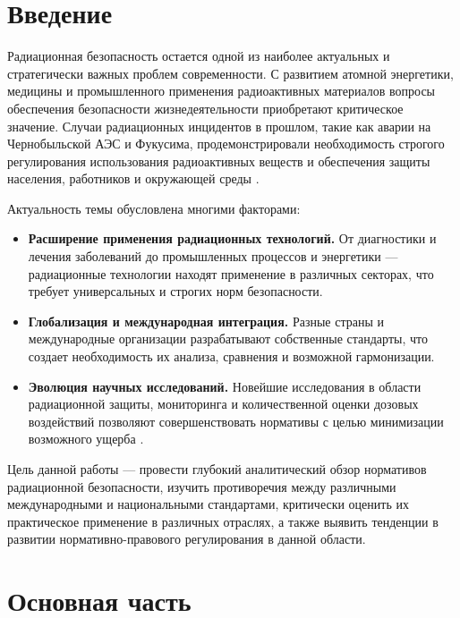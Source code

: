 \documentclass[a4paper, 14pt]{extarticle}
\begin{document}

\tableofcontents
\newpage

\section{Введение}

Радиационная безопасность остается одной из наиболее актуальных и стратегически важных проблем современности. С развитием атомной энергетики, медицины и промышленного применения радиоактивных материалов вопросы обеспечения безопасности жизнедеятельности приобретают критическое значение. Случаи радиационных инцидентов в прошлом, такие как аварии на Чернобыльской АЭС и Фукусима, продемонстрировали необходимость строгого регулирования использования радиоактивных веществ и обеспечения защиты населения, работников и окружающей среды \cite{4}.

Актуальность темы обусловлена многими факторами:

\begin{itemize}
    \item \textbf{Расширение применения радиационных технологий.} От диагностики и лечения заболеваний до промышленных процессов и энергетики — радиационные технологии находят применение в различных секторах, что требует универсальных и строгих норм безопасности.

    \item \textbf{Глобализация и международная интеграция.} Разные страны и международные организации разрабатывают собственные стандарты, что создает необходимость их анализа, сравнения и возможной гармонизации.

    \item \textbf{Эволюция научных исследований.} Новейшие исследования в области радиационной защиты, мониторинга и количественной оценки дозовых воздействий позволяют совершенствовать нормативы с целью минимизации возможного ущерба \cite{3}.
\end{itemize}

Цель данной работы — провести глубокий аналитический обзор нормативов радиационной безопасности, изучить противоречия между различными международными и национальными стандартами, критически оценить их практическое применение в различных отраслях, а также выявить тенденции в развитии нормативно-правового регулирования в данной области.

\section{Основная часть}
\end{document}
